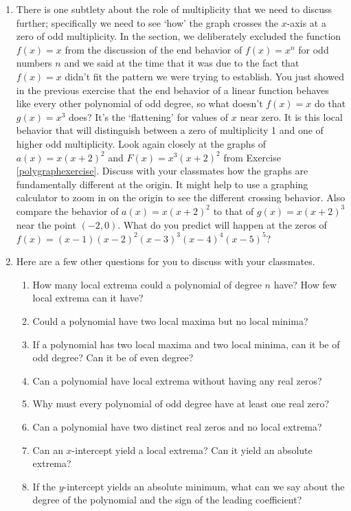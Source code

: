 \documentclass{ximera}
\begin{document}
\begin{enumerate}
\item {} There is one subtlety about the role of multiplicity that we need to discuss further; specifically we need to see `how' the graph crosses the $x$-axis at a zero of odd multiplicity.  In the section, we deliberately excluded the function $f(x) = x$ from the discussion of the end behavior of $f(x) = x^{n}$ for odd numbers $n$ and we said at the time that it was due to the fact that $f(x) = x$ didn't fit the pattern we were trying to establish.  You just showed in the previous exercise that the end behavior of a linear function behaves like every other polynomial of odd degree, so what doesn't $f(x) = x$ do that $g(x) = x^{3}$ does?  It's the `flattening' for values of $x$ near zero.  It is this local behavior that will distinguish between a zero of multiplicity 1 and one of higher odd multiplicity.  Look again closely at the graphs of $a(x) = x(x + 2)^{2}$ and $F(x) = x^{3}(x + 2)^{2}$ from Exercise \ref{polygraphexercise}.  Discuss with your classmates how the graphs are fundamentally different at the origin.  It might help to use a graphing calculator to zoom in on the origin to see the different crossing behavior. Also compare the behavior of $a(x) = x(x + 2)^{2}$ to that of $g(x) = x(x + 2)^{3}$ near the point $(-2, 0)$.  What do you predict will happen at the zeros of $f(x) = (x - 1)(x - 2)^2(x - 3)^{3}(x - 4)^{4}(x - 5)^{5}$?

\item Here are a few other questions for you to discuss with your classmates.  

\begin{enumerate}

\item How many local extrema could a polynomial of degree $n$ have?  How few local extrema can it have?
\item Could a polynomial have two local maxima but no local minima?  
\item If a polynomial has two local maxima and two local minima, can it be of odd degree?  Can it be of even degree?
\item Can a polynomial have local extrema without having any real zeros?
\item Why must every polynomial of odd degree have at least one real zero?
\item Can a polynomial have two distinct real zeros and no local extrema?
\item Can an $x$-intercept yield a local extrema?  Can it yield an absolute extrema?
\item If the $y$-intercept yields an absolute minimum, what can we say about the degree of the polynomial and the sign of the leading coefficient?   

\end{enumerate}

\setcounter{HW}{\value{enumi}}
\end{enumerate}
\newpage
\end{document}
